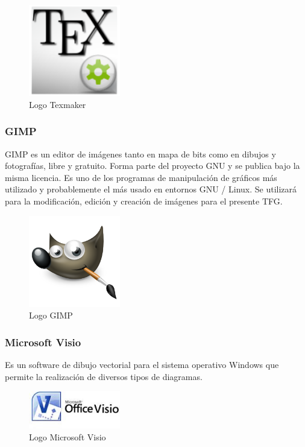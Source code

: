 		\begin{figure}[H]
		\centering
		\includegraphics[width=40mm, fbox={\fboxrule} 4mm]{images/04-metodo/34-texmaker_logo.png}
		\caption{Logo Texmaker}
		\label{fig:texmaker-logo}
		\end{figure}
		
		\subsubsection{\ac{GIMP}}
		\ac{GIMP} es un editor de imágenes tanto en mapa de bits como en dibujos y fotografías, libre y gratuito. Forma parte del proyecto \ac{GNU} y se publica bajo la misma licencia. Es uno de los programas de manipulación de gráficos más utilizado y probablemente el más usado en entornos GNU / Linux. Se utilizará para la modificación, edición y creación de imágenes para el presente \ac{TFG}.
		
		\begin{figure}[H]
		\centering
		\includegraphics[width=40mm, fbox={\fboxrule} 4mm]{images/04-metodo/35-gimp_logo.png}
		\caption{Logo \ac{GIMP}}
		\label{fig:gimp-logo}
		\end{figure}
		
		\subsubsection{Microsoft Visio}
		Es un software de dibujo vectorial para el sistema operativo Windows que permite la realización de diversos tipos de diagramas. 
		
		\begin{figure}[H]
		\centering
		\includegraphics[width=40mm, fbox={\fboxrule} 4mm]{images/04-metodo/36-visio_logo.jpg}
		\caption{Logo Microsoft Visio}
		\label{fig:visio-logo}
		\end{figure}
	
